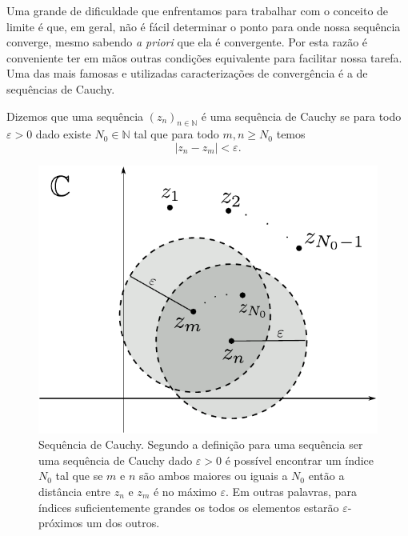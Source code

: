 Uma grande de dificuldade que enfrentamos para trabalhar com o conceito de limite é que, em geral,
não é fácil determinar o ponto para onde nossa sequência converge, mesmo sabendo \textit{a priori} que ela é 
convergente. Por esta razão é conveniente ter em mãos outras condições equivalente para facilitar nossa
tarefa. Uma das mais famosas e utilizadas caracterizações de convergência é a 
de sequências de Cauchy. 

\begin{definicao}\label{def-seq-Cauchy}
Dizemos que uma sequência $(z_n)_{n\in\mathbb{N}}$ é uma sequência de Cauchy se 
para todo $\varepsilon>0$ dado existe $N_0\in\mathbb{N}$ tal que para todo $m,n\geqslant N_0$
temos 
\[
|z_n-z_m|<\varepsilon.
\]
\end{definicao}
\begin{figure}[h]
\centering
\includegraphics[scale=0.6]{Figuras/fig-sequencia-Cauchy-2}
\caption{Sequência de Cauchy. Segundo a definição para uma sequência ser uma sequência de Cauchy dado $\varepsilon>0$
é possível encontrar um índice $N_0$ tal que se $m$ e $n$ são ambos maiores ou iguais a $N_0$ então 
a distância entre $z_n$ e $z_m$ é no máximo $\varepsilon$. Em outras palavras, para índices suficientemente
grandes os todos os elementos estarão $\varepsilon$-próximos um dos outros.}
\label{fig:fig-sequencia-cauchy}
\end{figure}


